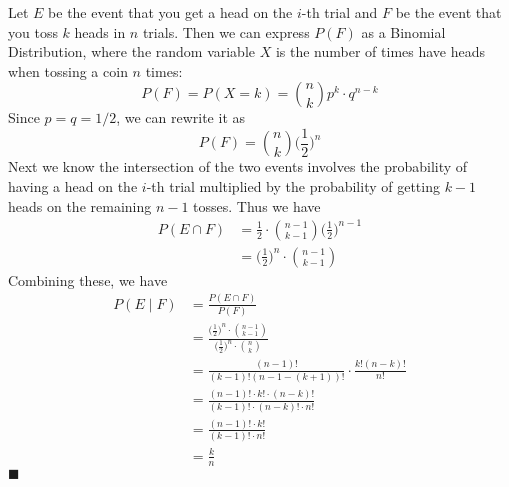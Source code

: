 \documentclass[11pt, oneside]{article}   	%
\newcommand*{\QEDA}{\hfill\ensuremath{\blacksquare}}         %
\begin{document}
Let $E$ be the event that you get a head on the $i$-th trial and $F$ be the event that you toss $k$ heads in $n$ trials. Then we can express $P(F)$ as a Binomial Distribution, where the random variable $X$ is the number of times have heads when tossing a coin $n$ times:
$$P(F) = P(X=k) = {n \choose k} p^k \cdot q^{n-k}$$
Since $p = q = 1/2$, we can rewrite it as
$$P(F) = {n \choose k} \Big(\frac{1}{2}\Big)^n$$
Next we know the intersection of the two events involves the probability of having a head on the $i$-th trial multiplied by the probability of getting $k-1$ heads on the remaining $n-1$ tosses. Thus we have
	\begin{align*}
		P(E \cap F) & = \frac{1}{2} \cdot {n-1 \choose k-1}\Big(\frac{1}{2}\Big)^{n-1} \\
		& = \Big(\frac{1}{2}\Big)^n \cdot {n-1 \choose k-1}
	\end{align*}
Combining these, we have
\begin{align*}
		P(E \mid F) & = \frac{P(E \cap F)}{P(F)} \\
		& = \frac{\Big(\frac{1}{2}\Big)^n \cdot {n-1 \choose k-1}}{ \Big(\frac{1}{2}\Big)^n \cdot {n \choose k}} \\
		& = \frac{(n-1)!}{(k-1)! (n-1-(k+1))!}\cdot \frac{k! (n-k)!}{n!} \\
		& = \frac{(n-1)! \cdot k! \cdot (n-k)!}{(k-1)! \cdot(n-k)! \cdot n!} \\
		& = \frac{(n-1)! \cdot k!}{(k-1)! \cdot n!} \\
		& = \frac{k}{n}
	\end{align*} 
\QEDA
\end{document}
